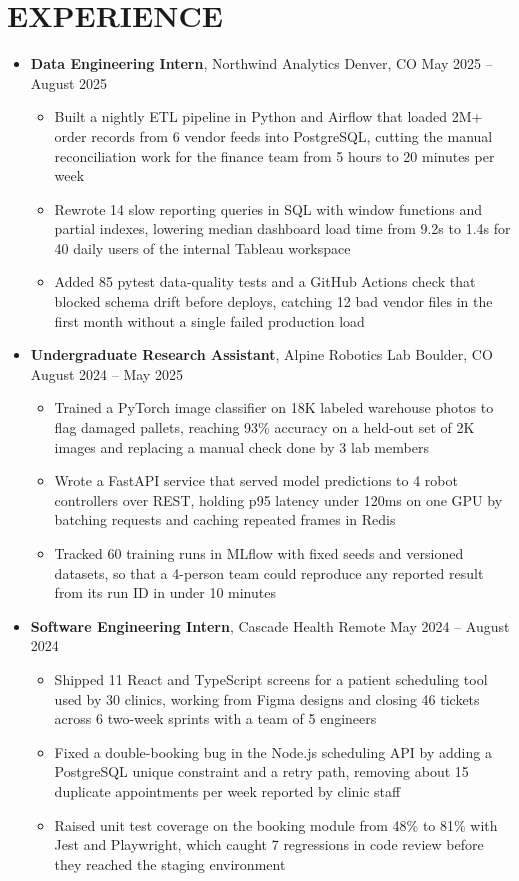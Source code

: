 \documentclass[letterpaper,10pt]{article}
\newlength{\entrygap}
\newcommand{\resumeItem}[1]{\item\small #1}
\newcommand{\resumeSubheading}[4]{
  \item \textbf{#3}, #1 {\small\textbar{} #2 \textbar{} #4}\par
}
\newcommand{\resumeSubHeadingListStart}{\begin{itemize}[leftmargin=0.15in,label={},itemsep=\entrygap,topsep=1pt,parsep=0pt,partopsep=0pt]}
\newcommand{\resumeSubHeadingListEnd}{\end{itemize}}
\newcommand{\resumeItemListStart}{\begin{itemize}[leftmargin=0.17in,label=\textbullet,itemsep=2pt,topsep=2pt,parsep=0pt,partopsep=0pt]}
\newcommand{\resumeItemListEnd}{\end{itemize}}
\begin{document}
\section{EXPERIENCE}
\resumeSubHeadingListStart
  \resumeSubheading
    {Northwind Analytics}{Denver, CO}
    {Data Engineering Intern}{May 2025 -- August 2025}
    \resumeItemListStart
      \resumeItem{Built a nightly ETL pipeline in Python and Airflow that loaded 2M+ order records from 6 vendor feeds into PostgreSQL, cutting the manual reconciliation work for the finance team from 5 hours to 20 minutes per week}
      \resumeItem{Rewrote 14 slow reporting queries in SQL with window functions and partial indexes, lowering median dashboard load time from 9.2s to 1.4s for 40 daily users of the internal Tableau workspace}
      \resumeItem{Added 85 pytest data-quality tests and a GitHub Actions check that blocked schema drift before deploys, catching 12 bad vendor files in the first month without a single failed production load}
    \resumeItemListEnd
  \resumeSubheading
    {Alpine Robotics Lab}{Boulder, CO}
    {Undergraduate Research Assistant}{August 2024 -- May 2025}
    \resumeItemListStart
      \resumeItem{Trained a PyTorch image classifier on 18K labeled warehouse photos to flag damaged pallets, reaching 93\% accuracy on a held-out set of 2K images and replacing a manual check done by 3 lab members}
      \resumeItem{Wrote a FastAPI service that served model predictions to 4 robot controllers over REST, holding p95 latency under 120ms on one GPU by batching requests and caching repeated frames in Redis}
      \resumeItem{Tracked 60 training runs in MLflow with fixed seeds and versioned datasets, so that a 4-person team could reproduce any reported result from its run ID in under 10 minutes}
    \resumeItemListEnd
  \resumeSubheading
    {Cascade Health}{Remote}
    {Software Engineering Intern}{May 2024 -- August 2024}
    \resumeItemListStart
      \resumeItem{Shipped 11 React and TypeScript screens for a patient scheduling tool used by 30 clinics, working from Figma designs and closing 46 tickets across 6 two-week sprints with a team of 5 engineers}
      \resumeItem{Fixed a double-booking bug in the Node.js scheduling API by adding a PostgreSQL unique constraint and a retry path, removing about 15 duplicate appointments per week reported by clinic staff}
      \resumeItem{Raised unit test coverage on the booking module from 48\% to 81\% with Jest and Playwright, which caught 7 regressions in code review before they reached the staging environment}
    \resumeItemListEnd
\resumeSubHeadingListEnd
\end{document}
